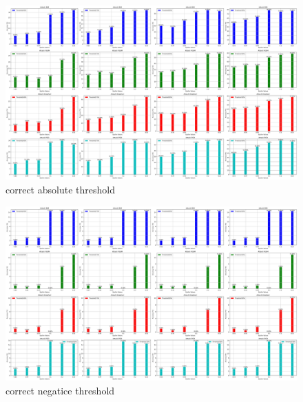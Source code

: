\documentclass[10pt, conference, a4paper, final]{IEEEtran}
\begin{document}
        



        
            \begin{figure}
                \centering
                \includegraphics[width=\linewidth]{paper_images/correct absolute threshold.png}
                \caption{correct absolute threshold}
                \label{fig:fgsm_c}
            \end{figure}
            \par\medskip %
            \begin{figure}
                \centering
                \includegraphics[width=\linewidth]{paper_images/correct negatice threshold.png}
                \caption{correct negatice threshold}
                \label{fig:deep_c}
            \end{figure}
\end{document}
